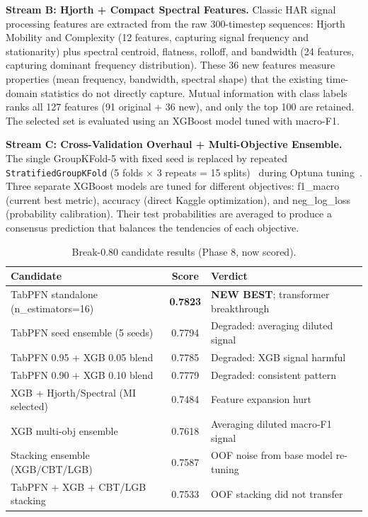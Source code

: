 \documentclass[12pt, a4paper]{article}
\begin{document}
\textbf{Stream B: Hjorth + Compact Spectral Features.} Classic HAR signal processing features are extracted from the raw 300-timestep sequences: Hjorth Mobility and Complexity (12 features, capturing signal frequency and stationarity) plus spectral centroid, flatness, rolloff, and bandwidth (24 features, capturing dominant frequency distribution). These 36 new features measure properties (mean frequency, bandwidth, spectral shape) that the existing time-domain statistics do not directly capture. Mutual information with class labels ranks all 127 features (91 original + 36 new), and only the top 100 are retained. The selected set is evaluated using an XGBoost model tuned with macro-F1.

\textbf{Stream C: Cross-Validation Overhaul + Multi-Objective Ensemble.} The single GroupKFold-5 with fixed seed is replaced by repeated \texttt{StratifiedGroupKFold} (5 folds $\times$ 3 repeats = 15 splits)~\cite{pedregosa2011sklearn} during Optuna tuning~\cite{akiba2019optuna}. Three separate XGBoost models are tuned for different objectives: f1\_macro (current best metric), accuracy (direct Kaggle optimization), and neg\_log\_loss (probability calibration). Their test probabilities are averaged to produce a consensus prediction that balances the tendencies of each objective.

\begin{table}[h]
\centering
\caption{Break-0.80 candidate results (Phase 8, now scored).}
\label{tab:phase8}
\begin{tabularx}{\textwidth}{@{} Y c Y @{}}
\toprule
\textbf{Candidate} & \textbf{Score} & \textbf{Verdict} \\ \midrule
TabPFN standalone (n\_estimators=16) & \textbf{0.7823} & \textbf{NEW BEST}; transformer breakthrough \\
TabPFN seed ensemble (5 seeds) & 0.7794 & Degraded: averaging diluted signal \\
TabPFN 0.95 + XGB 0.05 blend & 0.7785 & Degraded: XGB signal harmful \\
TabPFN 0.90 + XGB 0.10 blend & 0.7779 & Degraded: consistent pattern \\
XGB + Hjorth/Spectral (MI selected) & 0.7484 & Feature expansion hurt \\
XGB multi-obj ensemble & 0.7618 & Averaging diluted macro-F1 signal \\
Stacking ensemble (XGB/CBT/LGB) & 0.7587 & OOF noise from base model re-tuning \\
TabPFN + XGB + CBT/LGB stacking & 0.7533 & OOF stacking did not transfer \\ \bottomrule
\end{tabularx}
\end{table}
\end{document}
